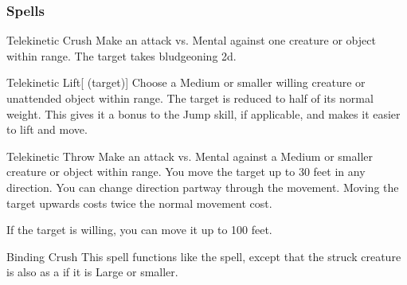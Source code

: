 \subsubsection{Spells}


\lowercase{\hypertarget{spell:Telekinetic Crush}{}}\label{spell:Telekinetic Crush}
\begin{apability}[\nth{1}]{\hypertarget{spell:Telekinetic Crush}{Telekinetic Crush}}
Make an attack vs. Mental against one creature or object within \rngmed range.
\hit The target takes bludgeoning  \plus2d.
\end{apability}
\vspace{0.25em}



\lowercase{\hypertarget{spell:Telekinetic Lift}{}}\label{spell:Telekinetic Lift}
\begin{attuneability}[\nth{1}]{\hypertarget{spell:Telekinetic Lift}{Telekinetic Lift}}[ (target)]
Choose a Medium or smaller willing creature or unattended object within \rngclose range.
The target is reduced to half of its normal weight.
This gives it a  bonus to the Jump skill, if applicable, and makes it easier to lift and move.
\end{attuneability}
\vspace{0.25em}



\lowercase{\hypertarget{spell:Telekinetic Throw}{}}\label{spell:Telekinetic Throw}
\begin{apability}[\nth{1}]{\hypertarget{spell:Telekinetic Throw}{Telekinetic Throw}}
Make an attack vs. Mental against a Medium or smaller creature or object within \rngmed range.
\hit You move the target up to 30 feet in any direction.
You can change direction partway through the movement.
Moving the target upwards costs twice the normal movement cost.

If the target is willing, you can move it up to 100 feet.
\end{apability}
\vspace{0.25em}



\lowercase{\hypertarget{spell:Binding Crush}{}}\label{spell:Binding Crush}
\begin{apability}[\nth{2}]{\hypertarget{spell:Binding Crush}{Binding Crush}}
This spell functions like the  spell, except that the struck creature is also  as a  if it is Large or smaller.
\end{apability}
\vspace{0.25em}



